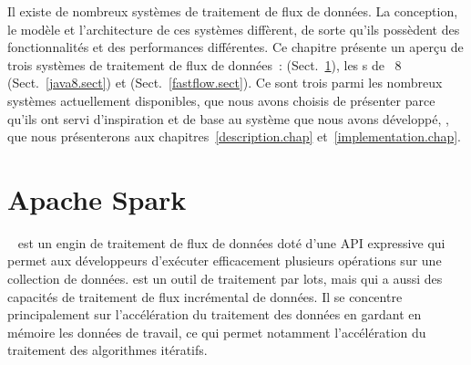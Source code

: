






Il existe de nombreux syst\`emes de traitement de flux de donn\'ees. La conception, le mod\`ele et l'architecture de ces syst\`emes diff\`erent, de sorte qu'ils poss\`edent des fonctionnalit\'es et des performances diff\'erentes. Ce chapitre pr\'esente un aper\c{c}u de trois syst\`emes de traitement de flux de donn\'ees~:  (Sect.~\ref{spark.sect}), les s de ~8 (Sect.~\ref{java8.sect}) et  (Sect.~\ref{fastflow.sect}).  Ce sont trois parmi les nombreux syst\`emes actuellement disponibles, que nous avons choisis de pr\'esenter parce qu'ils ont servi d'inspiration et de base au syst\`eme que nous avons d\'evelopp\'e, \ppff, que nous pr\'esenterons aux chapitres~\ref{description.chap} et~\ref{implementation.chap}.


\section{Apache Spark}

\label{spark.sect}




~\citep{apachSpark} est un engin de traitement de flux de donn\'ees dot\'e d'une API expressive qui permet aux d\'eveloppeurs d'ex\'ecuter efficacement plusieurs op\'erations sur une collection de donn\'ees.  est un outil de traitement par lots, mais qui a aussi des capacit\'es de traitement de flux incr\'emental de donn\'ees. Il se concentre principalement sur l'acc\'el\'eration du traitement des donn\'ees en gardant en m\'emoire les donn\'ees de travail, ce qui permet notamment l'acc\'el\'eration du traitement des algorithmes it\'eratifs.

